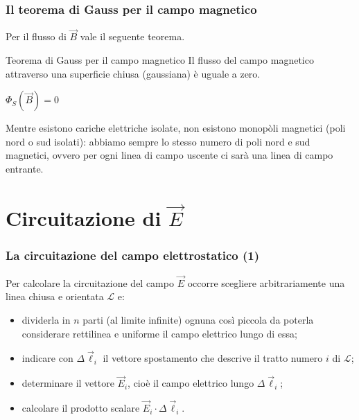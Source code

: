 \documentclass[]{beamer}
\theoremstyle{plain}
\begin{document}
\begin{frame}
  \frametitle{Il teorema di Gauss per il campo magnetico}
  Per il flusso di $ \vec{B} $ vale il seguente teorema.
  \begin{block}{Teorema di Gauss per il campo magnetico}
    Il flusso del campo magnetico attraverso una superficie chiusa (gaussiana) è uguale a zero.
    \begin{center}
   \colorbox{blue!30}{$ \Phi_S (\vec{B}) = 0 $}
   \end{center}
  \end{block}\pause
  Mentre esistono cariche elettriche isolate, non esistono monopòli magnetici (poli nord o sud isolati): abbiamo sempre lo stesso numero di poli nord e sud magnetici, ovvero \alert{per ogni linea di campo uscente ci sarà una linea di campo entrante}.
\end{frame}


\section{Circuitazione di $ \vec{E} $}



\begin{frame}
  \frametitle{La circuitazione del campo elettrostatico (1)}
  Per calcolare la circuitazione del campo $ \vec{E} $ occorre scegliere arbitrariamente una linea chiusa e orientata $ \mathscr{L} $ e:\pause
  \begin{itemize}
    \item dividerla in $ n $ parti (al limite infinite) ognuna così piccola da poterla considerare \alert<2>{rettilinea} e \alert<2>{uniforme} il campo elettrico lungo di essa;\pause
    \item indicare con $ \Delta \vec{\ell}_i $ il \alert<3>{vettore spostamento} che descrive il tratto numero $ i $ di $ \mathscr{L} $;\pause
    \item determinare il vettore $ \vec{E}_i $, cioè il \alert<4>{campo elettrico lungo $ \Delta \vec{\ell}_i $};\pause
    \item calcolare il \alert<5>{prodotto scalare} $ \vec{E}_i \cdot \Delta \vec{\ell}_i $.
  \end{itemize}
\end{frame}
\end{document}
